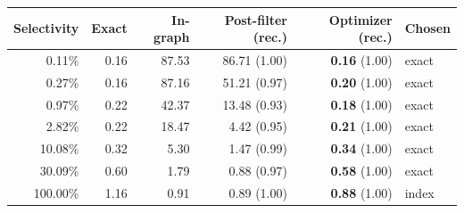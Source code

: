 \begin{tabular}{rrrrrl}
\toprule
Selectivity & Exact & In-graph & Post-filter (rec.) & Optimizer (rec.) & Chosen \\
\midrule
0.11\% & 0.16 & 87.53 & 86.71 (1.00) & \textbf{0.16} (1.00) & exact \\
0.27\% & 0.16 & 87.16 & 51.21 (0.97) & \textbf{0.20} (1.00) & exact \\
0.97\% & 0.22 & 42.37 & 13.48 (0.93) & \textbf{0.18} (1.00) & exact \\
2.82\% & 0.22 & 18.47 & 4.42 (0.95) & \textbf{0.21} (1.00) & exact \\
10.08\% & 0.32 & 5.30 & 1.47 (0.99) & \textbf{0.34} (1.00) & exact \\
30.09\% & 0.60 & 1.79 & 0.88 (0.97) & \textbf{0.58} (1.00) & exact \\
100.00\% & 1.16 & 0.91 & 0.89 (1.00) & \textbf{0.88} (1.00) & index \\
\bottomrule
\end{tabular}
